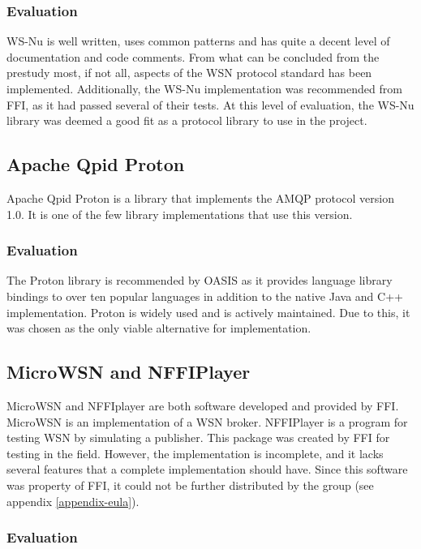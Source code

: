 \subsubsection{Evaluation}
\label{subsec:prestudies-existing_solution-ws_nu-evaluation}

WS-Nu is well written, uses common patterns and has quite a decent level of documentation and code comments. From what can be concluded from the prestudy most, if not all, aspects of the WSN protocol standard has been implemented. Additionally, the WS-Nu implementation was recommended from FFI, as it had passed several of their tests. At this level of evaluation, the WS-Nu library was deemed a good fit as a protocol library to use in the project.

\subsection{Apache Qpid Proton}
\label{subsub-apache_qpid_proton}
Apache Qpid Proton \cite{amqp-qpid-proton} is a library that implements the AMQP protocol version 1.0. It is one of the few library implementations that use this version.

\subsubsection{Evaluation}
The Proton library is recommended by OASIS as it provides language library bindings to over ten popular languages in addition to the native Java and C++ implementation. Proton is widely used and is actively maintained. Due to this, it was chosen as the only viable alternative for implementation.

\subsection{MicroWSN and NFFIPlayer}
\label{subsec:prestudies-existing_solutions-micro_wsn_and_nffiplayer}

MicroWSN and NFFIplayer are both software developed and provided by FFI. MicroWSN is an implementation of a WSN broker. NFFIPlayer is a program for testing WSN by simulating a publisher. This package was created by FFI for testing in the field. However, the implementation is incomplete, and it lacks several features that a complete implementation should have. Since this software was property of FFI, it could not be further distributed by the group (see appendix \ref{appendix-eula}).

\subsubsection{Evaluation}
\label{subsec:prestudies-existing_solutions-micro_wsn_and_nffiplayer-evaluation}

